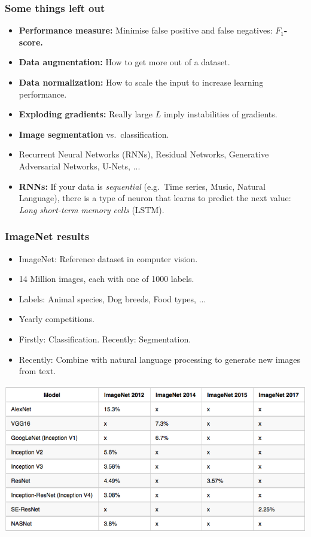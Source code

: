 \documentclass[10pt,hyperref={pdfpagelabels=false}]{beamer}
\begin{document}
\begin{frame}
    \frametitle{Some things left out}
    \begin{itemize}
        \item {\bf Performance measure:} Minimise false positive and false negatives: {\bf $F_1$-score.}
        \item {\bf Data augmentation:} How to get more out of a dataset.
        \item {\bf Data normalization:} How to scale the input to increase learning performance.
        \item {\bf Exploding gradients:} Really large $L$ imply instabilities of gradients.
        \item {\bf Image segmentation} vs.~classification.
        \item Recurrent Neural Networks (RNNs), Residual Networks, Generative Adversarial Networks, U-Nets, ...
        \item {\bf RNNs:} If your data is \emph{sequential} (e.g.~Time series, Music, Natural Language), there is a type of neuron that learns to predict the next value: \emph{Long short-term memory cells} (LSTM).
    \end{itemize}
\end{frame}
\begin{frame}[allowframebreaks]
    \frametitle{ImageNet results}
    \begin{itemize}
        \item ImageNet: Reference dataset in computer vision.
        \item 14 Million images, each with one of 1000 labels.
        \item Labels: Animal species, Dog breeds, Food types, ...
        \item Yearly competitions.
        \item Firstly: Classification. Recently: Segmentation.
        \item Recently: Combine with natural language processing to generate new images from text.
    \end{itemize}
    \framebreak
    \centering\includegraphics[width=.9\textwidth]{figures/imagenet_results.png}
\end{frame}
\end{document}
